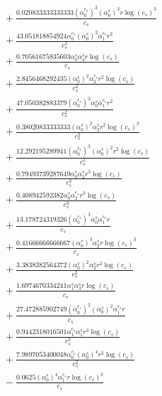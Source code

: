 \documentclass[10pt]{article}
\begin{document}
\begin{align*}
&{}  + \frac{0.020833333333333 \left(\alpha_{0}^{c_s}\right)^{3} \left(\alpha_{0}^s\right)^{3} r \log{\left(c_{s} \right)}^{3}}{c_{s}} \\
&{}  + \frac{43.051818854924 \alpha_{0}^{c_s} \left(\alpha_{0}^s\right)^{2} \alpha_{1}^{c_s} r^{2}}{c_{s}^{2}} \\
&{}  + \frac{0.70561675835603 \alpha_{0}^s \alpha_{4}^s r \log{\left(c_{s} \right)}}{c_{s}} \\
&{}  + \frac{2.8456468292435 \left(\alpha_{0}^s\right)^{2} \alpha_{2}^{c_s} r^{2} \log{\left(c_{s} \right)}}{c_{s}^{2}} \\
&{}  + \frac{47.050382883379 \left(\alpha_{0}^{c_s}\right)^{2} \alpha_{0}^s \alpha_{1}^{c_s} r^{2}}{c_{s}^{2}} \\
&{}  + \frac{0.38020833333333 \left(\alpha_{0}^s\right)^{2} \alpha_{2}^s r^{2} \log{\left(c_{s} \right)}^{3}}{c_{s}^{2}} \\
&{}  + \frac{12.292195289941 \left(\alpha_{0}^{c_s}\right)^{3} \left(\alpha_{0}^s\right)^{2} r^{2} \log{\left(c_{s} \right)}}{c_{s}^{2}} \\
&{}  + \frac{0.79493739287649 \alpha_{0}^s \alpha_{2}^s r^{3} \log{\left(c_{s} \right)}}{c_{s}^{3}} \\
&{}  + \frac{0.408942592382 \alpha_{0}^s \alpha_{2}^{c_s} r^{3} \log{\left(c_{s} \right)}}{c_{s}^{3}} \\
&{}  + \frac{13.178724319326 \left(\alpha_{0}^{c_s}\right)^{3} \alpha_{0}^s \alpha_{1}^{c_s} r}{c_{s}} \\
&{}  + \frac{0.41666666666667 \left(\alpha_{0}^s\right)^{3} \alpha_{2}^s r \log{\left(c_{s} \right)}^{3}}{c_{s}} \\
&{}  + \frac{3.3838382564372 \left(\alpha_{0}^s\right)^{2} \alpha_{2}^s r^{2} \log{\left(c_{s} \right)}}{c_{s}^{2}} \\
&{}  + \frac{1.6974670334241 \alpha_{1}^s \alpha_{3}^s r \log{\left(c_{s} \right)}}{c_{s}} \\
&{}  + \frac{27.472885902749 \left(\alpha_{0}^{c_s}\right)^{2} \left(\alpha_{0}^s\right)^{2} \alpha_{1}^{c_s} r}{c_{s}} \\
&{}  + \frac{0.9442318016501 \alpha_{1}^{c_s} \alpha_{1}^s r^{3} \log{\left(c_{s} \right)}}{c_{s}^{3}} \\
&{}  + \frac{7.9897053400048 \alpha_{0}^{c_s} \left(\alpha_{0}^s\right)^{4} r^{2} \log{\left(c_{s} \right)}}{c_{s}^{2}} \\
&{}  - \frac{0.0625 \left(\alpha_{0}^s\right)^{4} \alpha_{1}^{c_s} r \log{\left(c_{s} \right)}^{3}}{c_{s}} \\

\end{align*}
\end{document}
